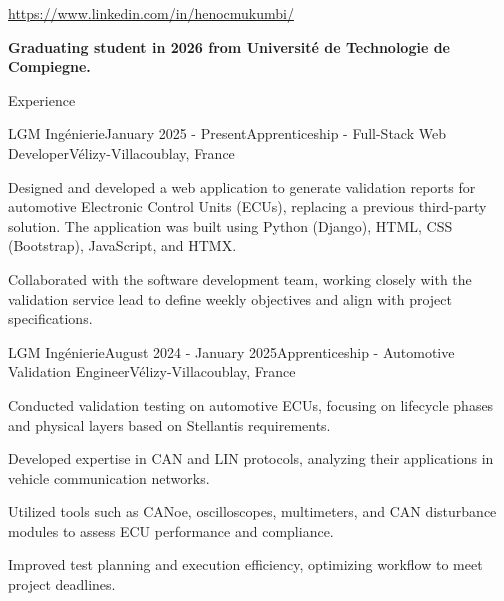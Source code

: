 \documentclass[
	10pt,
]{style} %
\begin{document}
\begin{center}
	\url{https://www.linkedin.com/in/henocmukumbi/}
\end{center}

\begin{center}
	\textbf{Graduating student in 2026 from Université de Technologie de Compiegne.}
\end{center}


\begin{rSection}{Experience}

	\begin{rSubsection}{LGM Ingénierie}{January 2025 - Present}{Apprenticeship - Full-Stack Web Developer}{Vélizy-Villacoublay, France}
		\item Designed and developed a web application to generate validation reports for automotive Electronic Control Units (ECUs), replacing a previous third-party solution. The application was built using Python (Django), HTML, CSS (Bootstrap), JavaScript, and HTMX.
		\item Collaborated with the software development team, working closely with the validation service lead to define weekly objectives and align with project specifications.
	\end{rSubsection}


	\begin{rSubsection}{LGM Ingénierie}{August 2024 - January 2025}{Apprenticeship - Automotive Validation Engineer}{Vélizy-Villacoublay, France}
		\item Conducted validation testing on automotive ECUs, focusing on lifecycle phases and physical layers based on Stellantis requirements.
		\item Developed expertise in CAN and LIN protocols, analyzing their applications in vehicle communication networks.
		\item Utilized tools such as CANoe, oscilloscopes, multimeters, and CAN disturbance modules to assess ECU performance and compliance.
		\item Improved test planning and execution efficiency, optimizing workflow to meet project deadlines.
	\end{rSubsection}



\end{rSection}
\end{document}
